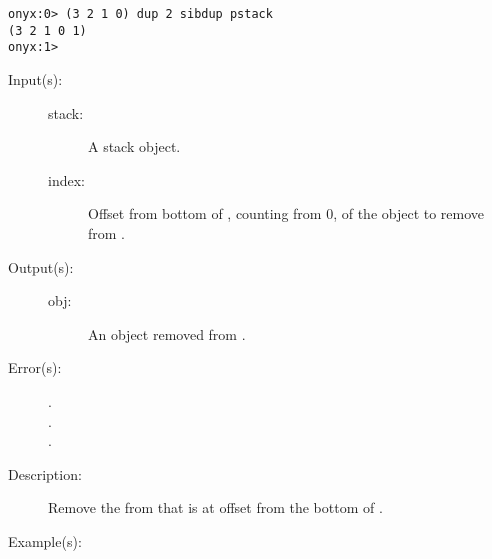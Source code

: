 \begin{description}
\begin{description}
\begin{verbatim}
onyx:0> (3 2 1 0) dup 2 sibdup pstack
(3 2 1 0 1)
onyx:1>
		\end{verbatim}
	\end{description}
\label{systemdict:sibpop}
\item[{\onyxop{stack index}{sibpop}{obj}}: ]
	\begin{description}\item[]
	\item[Input(s): ]
		\begin{description}\item[]
		\item[stack: ]
			A stack object.
		\item[index: ]
			Offset from bottom of , counting from 0, of
			the object to remove from .
		\end{description}
	\item[Output(s): ]
		\begin{description}\item[]
		\item[obj: ]
			An object removed from .
		\end{description}
	\item[Error(s): ]
		\begin{description}\item[]
		\item[.]
		\item[.]
		\item[.]
		\end{description}
	\item[Description: ]
		Remove the  from  that is at offset
		 from the bottom of .
	\item[Example(s): ]\begin{verbatim}


\end{verbatim}
\end{description}
\end{description}
